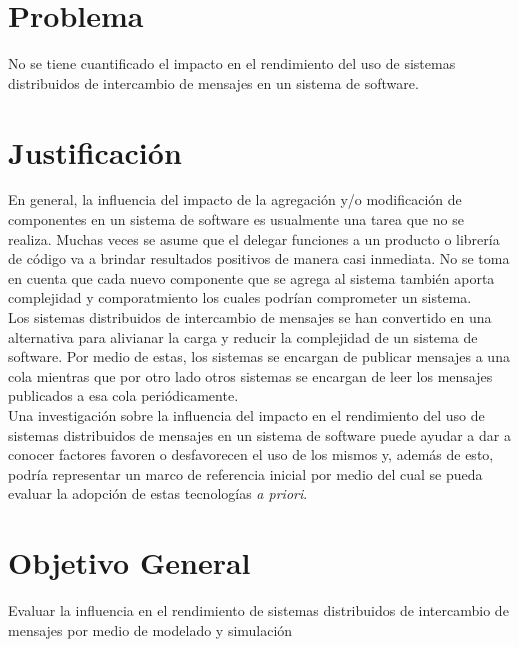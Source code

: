 \hspace{-0.6cm}

\section{Problema}
No se tiene cuantificado el impacto en el rendimiento del uso de sistemas distribuidos de intercambio de mensajes en un sistema de software. 

\section{Justificación}
En general, la influencia del impacto de la agregación y/o modificación de componentes en un sistema de software es usualmente una tarea que no se realiza. Muchas veces se asume que el delegar funciones a un producto o librería de código va a brindar resultados positivos de manera casi inmediata. No se toma en cuenta que cada nuevo componente que se agrega al sistema también aporta complejidad y comporatmiento los cuales podrían comprometer un sistema.\\ 

Los sistemas distribuidos de intercambio de mensajes se han convertido en una alternativa para alivianar la carga y reducir la complejidad de un sistema de software. Por medio de estas, los sistemas se encargan de publicar mensajes a una cola mientras que por otro lado otros sistemas se encargan de leer los mensajes publicados a esa cola periódicamente.\\

Una investigación sobre la influencia del impacto en el rendimiento del uso de  sistemas distribuidos de mensajes en un sistema de software puede ayudar a dar a conocer factores favoren o desfavorecen el uso de los mismos y, además de esto, podría representar un marco de referencia inicial por medio del cual se pueda evaluar la adopción de estas tecnologías \emph{a priori}. 

\section{Objetivo General}
Evaluar la influencia en el rendimiento de sistemas distribuidos de intercambio de mensajes por medio de modelado y simulación

\label{sec:original}
